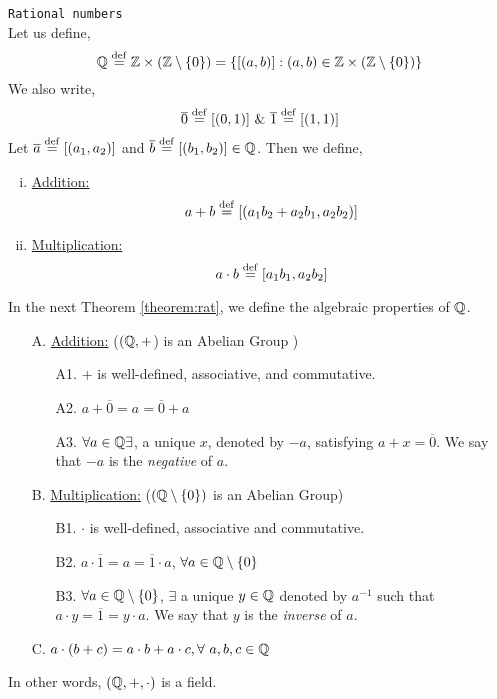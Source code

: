 \documentclass[11pt]{scrartcl}
\begin{document}
\begin{definition}
	\texttt{Rational numbers}\\
	Let us define, $$\mathbb Q \overset{\mathrm{def}}{=} \mathbb Z \times (\mathbb Z \setminus \{0\}) = \{[(a,b)]:(a,b) \in \mathbb Z \times (\mathbb Z \setminus \{0\})\}$$
	We also write,
	$$\overline{0} \overset{\mathrm{def}}{=} [(0,1)]\ \&\ \overline{1} \overset{\mathrm{def}}{=} [(1,1)]$$
	Let $\overline{a} \overset{\mathrm{def}}{=} [(a_{1}, a_{2})]$ and $\overline{b} \overset{\mathrm{def}}{=} [(b_{1}, b_{2})] \in \mathbb Q$. Then we define,
	\begin{enumerate}[i)]
		\item \underline{Addition:}
		$$a+b \overset{\mathrm{def}}{=} [(a_{1}b_{2}+a_{2}b_{1}, a_{2}b_{2})]$$
		\item \underline{Multiplication:}
		$$a \cdot b \overset{\mathrm{def}}{=} [a_{1}b_{1}, a_{2}b_{2}]$$
	\end{enumerate}
\end{definition}

In the next Theorem \ref{theorem:rat}, we define the algebraic properties of $\mathbb Q$.

\begin{theorem}
	
	\begin{enumerate}
	\item[A.] \underline{Addition:} ($(\mathbb Q, +$) is an Abelian Group )
	\begin{enumerate}
		\item[A1.] $+$ is well-defined, associative, and commutative.
		\item[A2.] $a+\overline{0} = a = \overline{0}+a$
		\item[A3.] $\forall a \in \mathbb Q \exists$, a unique $x$, denoted by $-a$, satisfying $a+x = \overline{0}$. We say that $-a$ is the \emph{negative} of $a$. 
	\end{enumerate}
	\item[B.] \underline{Multiplication:} ($(\mathbb Q \setminus \{0\})$ is an Abelian Group)
	\begin{enumerate}
		\item[B1.] $\cdot$ is well-defined, associative and commutative.
		\item[B2.] $a \cdot \overline{1} = a = \overline{1} \cdot a$, $\forall a \in \mathbb Q \setminus \{0\}$
		\item[B3.] $\forall a \in \mathbb Q \setminus \{0\}$, $\exists$ a unique $y \in \mathbb Q$ denoted by $a^{-1}$ such that $a \cdot y = \overline{1} = y \cdot a$. We say that $y$ is the \emph{inverse} of $a$.
	\end{enumerate}
	\item[C.] $a \cdot (b+c) = a \cdot b + a \cdot c, \forall\ a,b,c \in \mathbb Q$
	\end{enumerate}
	In other words, $(\mathbb Q, +, \cdot)$ is a field.
	\label{theorem:rat}
\end{theorem}
\end{document}
